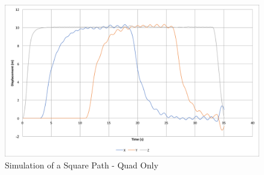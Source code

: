 \documentclass[11pt]{article}
\begin{document}
\begin{figure}
    \vspace{20em}
    \includegraphics[width=\linewidth]{square_path_quad_only}
    \caption{Simulation of a Square Path - Quad Only}
    \label{fig:square_path_quad_only}
\end{figure}
\end{document}
